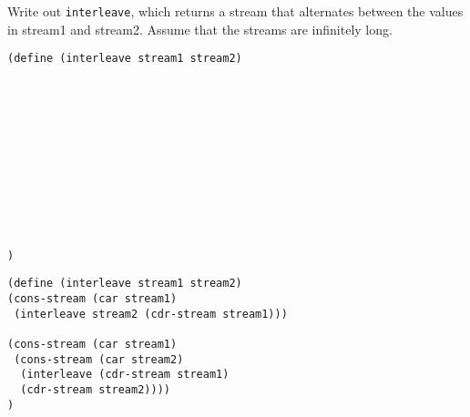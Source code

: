 \question Write out \texttt{interleave}, which returns a stream that alternates
between the values in stream1 and stream2. Assume that the streams are
infinitely long.

\begin{lstlisting}
(define (interleave stream1 stream2)












)
\end{lstlisting}

\begin{solution}
\begin{lstlisting}
(define (interleave stream1 stream2)
(cons-stream (car stream1)
 (interleave stream2 (cdr-stream stream1)))

(cons-stream (car stream1)
 (cons-stream (car stream2)
  (interleave (cdr-stream stream1)
  (cdr-stream stream2))))
)
\end{lstlisting}
\end{solution}
